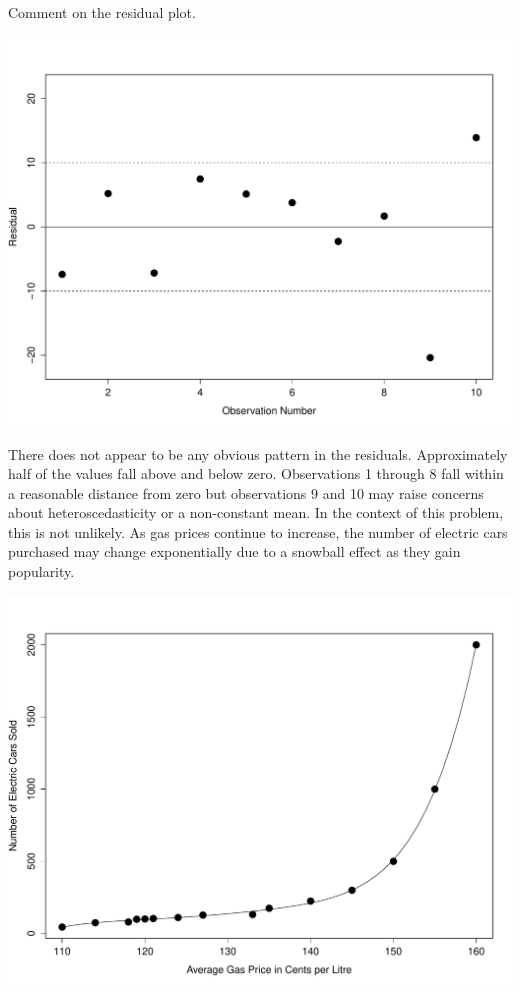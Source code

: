 \begin{example}
\begin{benumerate}
\item Comment on the residual plot. 

\begin{center}
\includegraphics[scale=0.40]{Section8/resplotexample.pdf}
\end{center}

There does not appear to be any obvious pattern in the residuals. Approximately half of the values fall above and below zero. Observations 1 through 8 fall within a reasonable distance from zero but observations 9 and 10 may raise concerns about heteroscedasticity or a non-constant mean. In the context of this problem, this is not unlikely. As gas prices continue to increase, the number of electric cars purchased may change exponentially due to a snowball effect as they gain popularity.

\begin{center}
\includegraphics[scale=0.40]{Section8/expochange.pdf}
\end{center}

\end{benumerate}
\end{example}









